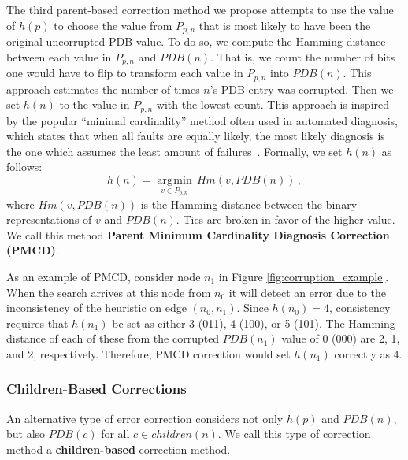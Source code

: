 \documentclass[letterpaper]{article}
\DeclareMathOperator*{\argmin}{\arg\!\min}
\begin{document}
The third parent-based correction method we propose attempts to use the value of $h(p)$ to choose the value from $P_{p,n}$ that is most likely to have been the original uncorrupted PDB value. To do so, we compute the Hamming distance between each value in $P_{p,n}$ and $PDB(n)$. That is, we count the number of bits one would have to flip to transform each value in $P_{p,n}$ into $PDB(n)$. %
This approach estimates the number of times $n$'s PDB entry was corrupted. Then we set $h(n)$ to the value in $P_{p,n}$ with the lowest count. This approach is inspired by the popular ``minimal cardinality'' method often used in automated diagnosis, which states that when all faults are equally likely, the most likely diagnosis is the one which assumes the least amount of failures~\cite{de1987diagnosing}.
Formally, we set $h(n)$ as follows:
\begin{equation}
h(n) = \underset{v \in P_{p,n}}{\argmin} \, Hm(v, PDB(n)) \,,
\end{equation}
\noindent
where $Hm(v, PDB(n))$ is the Hamming distance between the binary representations of $v$ and $PDB(n)$. Ties are broken in favor of the higher value. 
We call this method \textbf{Parent Minimum Cardinality Diagnosis Correction (PMCD)}.

As an example of PMCD, consider node $n_1$ in Figure \ref{fig:corruption_example}. When the search arrives at this node from $n_0$ it will detect an error due to the inconsistency of the heuristic on edge $(n_0, n_1)$.
Since $h(n_0)=4$, consistency requires that $h(n_1)$ be set as either 3 (011), 4 (100), or 5 (101). The Hamming distance of each of these from the corrupted $PDB(n_1)$ value of 0 (000) are 2, 1, and 2, respectively.
Therefore, PMCD correction would set $h(n_1)$ correctly as 4.

\subsubsection{Children-Based Corrections}

An alternative type of error correction considers not only $h(p)$ and $PDB(n)$, but also $PDB(c)$ for all $c \in children(n)$. We call this type of correction method a \textbf{children-based} correction method. 
\end{document}
